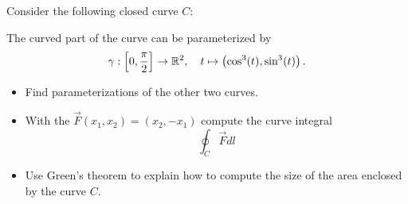 \documentclass[11pt]{article}
\begin{document}
\begin{exercise}
    Consider the following closed curve $C$:
    \begin{center}
    \end{center}
    The curved part of the curve can be parameterized by 
    \begin{align*}
        \gamma : \left[0,\frac{\pi}{2}\right] \to \mathbb{R}^2, \quad t \mapsto \left( \cos^3(t), \sin^3(t) \right).
    \end{align*}
    \begin{itemize}
        \item Find parameterizations of the other two curves.
        \item With the $\vec F(x_1,x_2) = (x_2,-x_1)$ compute the curve integral 
        \[ \oint_C \vec F dl \]
        \item Use Green's theorem to explain how to compute the size of the area enclosed by the curve $C$.
    \end{itemize}
\end{exercise}
\end{document}
